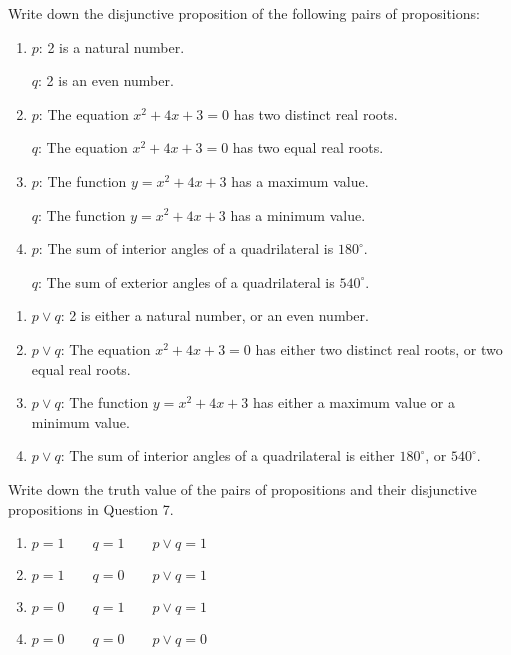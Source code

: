\documentclass{report}
\newcounter{example}
\begin{document}
\vspace{0.5cm}
\begin{example}
    \item Write down the disjunctive proposition of the following pairs of propositions:
    \begin{enumerate}[label=(\alph*), leftmargin=*]
        \item $p$: 2 is a natural number.

              $q$: 2 is an even number.

        \item $p$: The equation $x^2 + 4x + 3 = 0$ has two distinct real roots.

              $q$: The equation $x^2 + 4x + 3 = 0$ has two equal real roots.

        \item $p$: The function $y = x^2 + 4x + 3$ has a maximum value.

              $q$: The function $y = x^2 + 4x + 3$ has a minimum value.

        \item $p$: The sum of interior angles of a quadrilateral is $180^\circ$.

              $q$: The sum of exterior angles of a quadrilateral is $540^\circ$.
    \end{enumerate}
\end{example}
\begin{solution}
    \item \begin{enumerate}[label=, leftmargin=*]
        \item $p \lor q$: 2 is either a natural number, or an even number.
        \item $p \lor q$: The equation $x^2 + 4x + 3 = 0$ has either two distinct real roots, or two equal real roots.
        \item $p \lor q$: The function $y = x^2 + 4x + 3$ has either a maximum value or a minimum value.
        \item $p \lor q$: The sum of interior angles of a quadrilateral is either $180^\circ$, or $540^\circ$.
    \end{enumerate}
\end{solution}
\vspace{0.1cm}
\begin{example}
    \item Write down the truth value of the pairs of propositions and their disjunctive
    propositions in Question 7.
\end{example}
\begin{solution}
    \item \begin{enumerate}[label=, leftmargin=*]
        \item $p = 1 \qquad q = 1 \qquad p \lor q = 1$
        \item $p = 1 \qquad q = 0 \qquad p \lor q = 1$
        \item $p = 0 \qquad q = 1 \qquad p \lor q = 1$
        \item $p = 0 \qquad q = 0 \qquad p \lor q = 0$
    \end{enumerate}
\end{solution}
\end{document}

